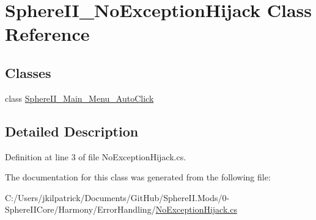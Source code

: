 \hypertarget{class_sphere_i_i___no_exception_hijack}{}\section{Sphere\+I\+I\+\_\+\+No\+Exception\+Hijack Class Reference}
\label{class_sphere_i_i___no_exception_hijack}
\subsection*{Classes}
\begin{DoxyCompactItemize}
\item 
class \mbox{\hyperlink{class_sphere_i_i___no_exception_hijack_1_1_sphere_i_i___main___menu___auto_click}{Sphere\+I\+I\+\_\+\+Main\+\_\+\+Menu\+\_\+\+Auto\+Click}}
\end{DoxyCompactItemize}


\subsection{Detailed Description}


Definition at line 3 of file No\+Exception\+Hijack.\+cs.



The documentation for this class was generated from the following file\+:\begin{DoxyCompactItemize}
\item 
C\+:/\+Users/jkilpatrick/\+Documents/\+Git\+Hub/\+Sphere\+I\+I.\+Mods/0-\/\+Sphere\+I\+I\+Core/\+Harmony/\+Error\+Handling/\mbox{\hyperlink{_no_exception_hijack_8cs}{No\+Exception\+Hijack.\+cs}}\end{DoxyCompactItemize}
